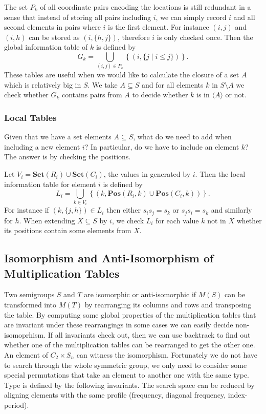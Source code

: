 \documentclass{amsart}
\newcommand{\Set}{\mathbf{Set}}
\newcommand{\Pos}{\mathbf{Pos}}
\theoremstyle{plain}
\theoremstyle{definition}
\begin{document}
The set $P_k$ of all coordinate pairs encoding the locations is still redundant in a sense that instead of storing all pairs including $i$, we can simply record $i$ and all second  elements in  pairs where $i$ is the first element.
For instance $(i,j)$ and $(i,h)$ can be stored as $(i,\{h,j\})$, therefore $i$ is only checked once.
Then the  global information table of $k$ is defined by
$$G_k=\bigcup_{(i,j)\in P_k} \left\{ (i,\{j\mid i\leq j\})\right\}.$$
These tables are useful when we would like to calculate the closure of a set $A$ which is relatively big in $S$.
We take $A\subseteq S$ and for all elements $k$ in $S\setminus A$ we check whether $G_k$ contains pairs from $A$ to decide whether $k$ is in $\langle A\rangle$ or not. 

\subsubsection{Local Tables} Given that we have a set elements $A\subseteq S$, what do we need to add when including a new element $i$?
In particular, do we have to include an element $k$? The answer is by checking the positions. 

Let $V_i=\Set(R_i)\cup\Set(C_i)$, the values in generated by $i$. Then the  local information table for element $i$ is defined by
$$L_i=\bigcup_{k\in V_i}\left\{(k,\Pos(R_i,k)\cup\Pos(C_i,k))\right\}.$$
For instance if $(k,\{j,h\})\in L_i$ then either $s_is_j=s_k$ or $s_js_i=s_k$ and similarly for $h$.
When  extending $X\subseteq S$ by $i$, we check $L_i$ for each value $k$ not in $X$ whether its positions contain some elements from $X$. 
\subsection{Isomorphism and Anti-Isomorphism of Multiplication Tables}
Two semigroups $S$ and $T$ are isomorphic or anti-isomorphic if $M(S)$ can be transformed into $M(T)$ by rearranging its columns and rows and transposing the table.
By computing some global properties of the multiplication tables that are invariant under these rearrangings in some cases we can easily decide non-isomoprhism.
If all invariants check out, then we can use backtrack to find out whether one of the multiplication tables can be rearranged to get the other one.
An element of $C_2\times S_n$ can witness the isomorphism.
Fortunately we do not have to search through the whole symmetric group, we only need to consider some special permutations that take an element to another one with the same type.
Type is defined by the following invariants.
The search space can be reduced by aligning elements with the same profile (frequency, diagonal frequency, index-period).
\end{document}

